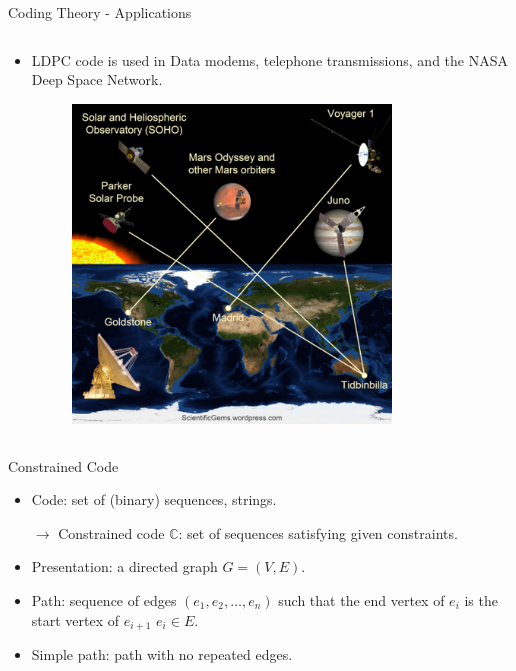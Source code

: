 \begin{frame}{Coding Theory - Applications}
\begin{columns}
        \begin{column}{0.5\textwidth}
            \begin{itemize}
                \vfill \item LDPC code is used in Data modems, telephone transmissions, and the NASA Deep Space Network.
                \begin{figure}
                    \centering
                    \includegraphics[width=0.8\textwidth,height=0.6\textheight]{Images/Introduction/NASA.png}
                \end{figure}
            \end{itemize}
        \end{column}
    \end{columns}
\end{frame}


\begin{frame}{Constrained Code}
    \begin{itemize}
        \vfill \item Code: set of (binary) sequences, strings.
        
        $\rightarrow$ Constrained code $\mathbb{C}$: set of sequences satisfying given constraints.
        \vfill \item Presentation: a directed graph $G=(V,E)$.
        \vfill \item Path: sequence of edges $\left(e_{1},e_{2},\ldots,e_{n}\right)$ such that the end vertex of $e_{i}$ is the start vertex of $e_{i+1}$ $e_{i}\in E$. 
        \vfill \item Simple path: path with no repeated edges.
    \end{itemize}
\end{frame}

